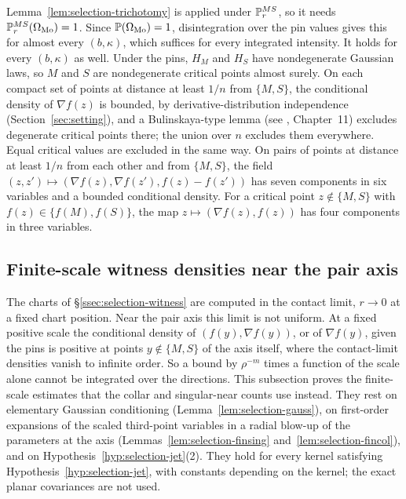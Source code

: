 \begin{remark}\label{rem:selection-morse}
Lemma~\ref{lem:selection-trichotomy} is applied under $\mathbb P^{MS}_r$, so it needs $\mathbb P^{MS}_r(\Omega_{\rm Mo})=1$. Since $\mathbb P(\Omega_{\rm Mo})=1$, disintegration over the pin values gives this for almost every $(b,\kappa)$, which suffices for every integrated intensity. It holds for every $(b,\kappa)$ as well. Under the pins, $H_M$ and $H_S$ have nondegenerate Gaussian laws, so $M$ and $S$ are nondegenerate critical points almost surely. On each compact set of points at distance at least $1/n$ from $\{M,S\}$, the conditional density of $\nabla f(z)$ is bounded, by derivative-distribution independence (Section~\ref{sec:setting}), and a Bulinskaya-type lemma (see \cite{AdlerTaylor}, Chapter~11) excludes degenerate critical points there; the union over $n$ excludes them everywhere. Equal critical values are excluded in the same way. On pairs of points at distance at least $1/n$ from each other and from $\{M,S\}$, the field $(z,z')\mapsto(\nabla f(z),\nabla f(z'),f(z)-f(z'))$ has seven components in six variables and a bounded conditional density. For a critical point $z\notin\{M,S\}$ with $f(z)\in\{f(M),f(S)\}$, the map $z\mapsto(\nabla f(z),f(z))$ has four components in three variables.
\end{remark}

\subsection{Finite-scale witness densities near the pair axis}\label{ssec:selection-finite}

The charts of \S\ref{ssec:selection-witness} are computed in the contact limit, $r\to0$ at a fixed chart position. Near the pair axis this limit is not uniform. At a fixed positive scale the conditional density of $(f(y),\nabla f(y))$, or of $\nabla f(y)$, given the pins is positive at points $y\notin\{M,S\}$ of the axis itself, where the contact-limit densities vanish to infinite order. So a bound by $\rho^{-m}$ times a function of the scale alone cannot be integrated over the directions. This subsection proves the finite-scale estimates that the collar and singular-near counts use instead. They rest on elementary Gaussian conditioning (Lemma~\ref{lem:selection-gauss}), on first-order expansions of the scaled third-point variables in a radial blow-up of the parameters at the axis (Lemmas~\ref{lem:selection-finsing} and~\ref{lem:selection-fincol}), and on Hypothesis~\ref{hyp:selection-jet}(2). They hold for every kernel satisfying Hypothesis~\ref{hyp:selection-jet}, with constants depending on the kernel; the exact planar covariances are not used.

